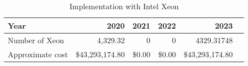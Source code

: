 \tiny \begin{longtable} { |p{}  |r  |r  |r  |r  |r |} 
\caption{Implementation with Intel Xeon \label{tab:Xeon}}\\ 
\hline 
\textbf{Year}&\textbf{2020}&\textbf{2021}&\textbf{2022}&\textbf{2023} \\ \hline
{Number of Xeon}&{4,329.32}&{0}&{0}&{4329.31748} \\ \hline
{Approximate cost}&{\$43,293,174.80}&{\$0.00}&{\$0.00}&{\$43,293,174.80} \\ \hline
\end{longtable} \normalsize

